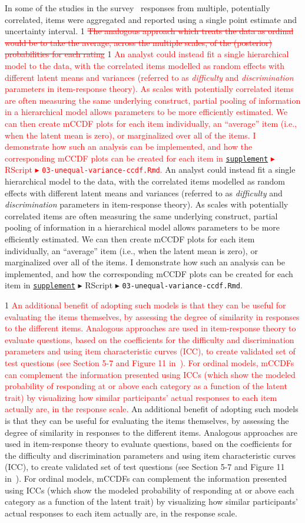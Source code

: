 \documentclass{vgtc}                          %
\def\trackchanges{0}
\newcommand{\new}[1]{%
\if\trackchanges1%
\textcolor{red}{#1}%
\else#1\fi}
\newcommand{\stout}[1]{\if\trackchanges1 \textcolor{red}{\sout{#1}} \fi}
\newcommand{\supplement}{\href{https://osf.io/cdgby/}{\texttt{supplement}}}
\begin{document}
In some of the studies in the survey~\cite{cabouat_previs_2025, yang_swaying_2024, yang_dice_2024} responses from multiple, potentially correlated, items were aggregated and reported using a single point estimate and uncertainty interval.%
\stout{
The analogous approach which treats the data as ordinal would be to take the average, across the multiple scales, of the (posterior) probabilities for each rating
}
\new{
An analyst could instead fit a single hierarchical model to the data, with the correlated items modelled as random effects with different latent means and variances (referred to as \textit{difficulty} and \textit{discrimination} parameters in item-response theory). As scales with potentially correlated items are often measuring the same underlying construct, partial pooling of information in a hierarchical model allows parameters to be more efficiently estimated. We can then create mCCDF plots for each item individually, an ``average'' item (i.e., when the latent mean is zero), or marginalized over all of the items. I demonstrate how such an analysis can be implemented, and how the corresponding mCCDF plots can be created for each item in \supplement{} $\blacktriangleright$ RScript $\blacktriangleright$ \texttt{03-unequal-variance-ccdf.Rmd}.
}

\new{
An additional benefit of adopting such models is that they can be useful for evaluating the items themselves, by assessing the degree of similarity in responses to the different items. Analogous approaches are used in item-response theory to evaluate questions, based on the coefficients for the difficulty and discrimination parameters and using item characteristic curves (ICC), to create validated set of test questions (see Section 5-7 and Figure 11 in~\cite{ge_calvi_2023}). For ordinal models, mCCDFs can complement the information presented using ICCs (which show the modeled probability of responding at or above each category as a function of the latent trait) by visualizing how similar participants' actual responses to each item actually are, in the response scale.
}

\end{document}
